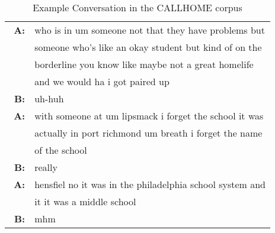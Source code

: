 \begin{table}[t!]
    \centering
    \small
    \caption{\small Example Conversation in the CALLHOME corpus}
    \begin{tabular}{rl}
      \hline
        \textbf{A:} & who is in um someone not that they have problems but\\
        		    & someone who's like an okay student but kind of on the\\
        			& borderline you know like maybe not a great homelife\\
        			& and we would ha i got paired up\\
		\textbf{B:} & uh-huh \\
\textbf{A:} & with someone at um lipsmack i forget the school it was\\
			& actually in port richmond um breath i forget the name\\
			& of the school\\\
\textbf{B:} & really\\
\textbf{A:} & hensfiel no it was in the philadelphia school system and\\ 
			& it it was a middle school\\
\textbf{B:} & mhm\\
      \hline
    \end{tabular}
    \label{table:phone_data}
\end{table}